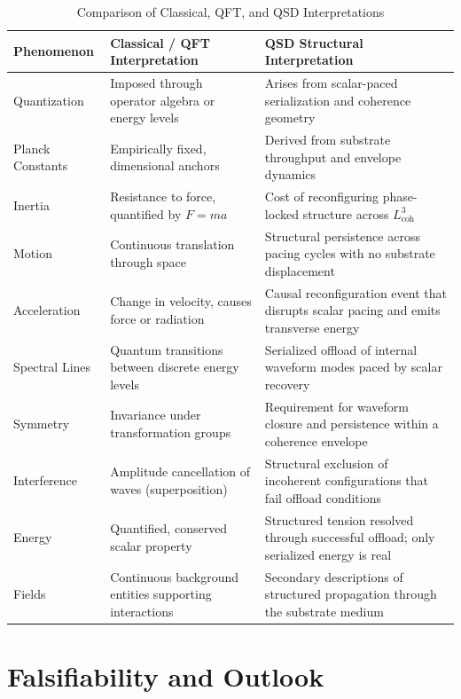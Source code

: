 \documentclass[entropy,article,submit,pdftex,moreauthors]{Definitions/mdpi}
\begin{document}
\begin{table}[H]
\centering
\caption{Comparison of Classical, QFT, and QSD Interpretations}
\label{fig:compare}
\begin{tabular}{|p{2.8cm}|p{3.5cm}|p{6.0cm}|}
\hline
\textbf{Phenomenon} & \textbf{Classical / QFT Interpretation} & \textbf{QSD Structural Interpretation} \\
\hline
Quantization & Imposed through operator algebra or energy levels & Arises from scalar-paced serialization and coherence geometry \\
\hline
Planck Constants & Empirically fixed, dimensional anchors & Derived from substrate throughput and envelope dynamics \\
\hline
Inertia & Resistance to force, quantified by \( F = ma \) & Cost of reconfiguring phase-locked structure across \( L_{\text{coh}}^3 \) \\
\hline
Motion & Continuous translation through space & Structural persistence across pacing cycles with no substrate displacement \\
\hline
Acceleration & Change in velocity, causes force or radiation & Causal reconfiguration event that disrupts scalar pacing and emits transverse energy \\
\hline
Spectral Lines & Quantum transitions between discrete energy levels & Serialized offload of internal waveform modes paced by scalar recovery \\
\hline
Symmetry & Invariance under transformation groups & Requirement for waveform closure and persistence within a coherence envelope \\
\hline
Interference & Amplitude cancellation of waves (superposition) & Structural exclusion of incoherent configurations that fail offload conditions \\
\hline
Energy & Quantified, conserved scalar property & Structured tension resolved through successful offload; only serialized energy is real \\
\hline
Fields & Continuous background entities supporting interactions & Secondary descriptions of structured propagation through the substrate medium \\
\hline
\end{tabular}
\end{table}


\section*{Falsifiability and Outlook}
\end{document}
